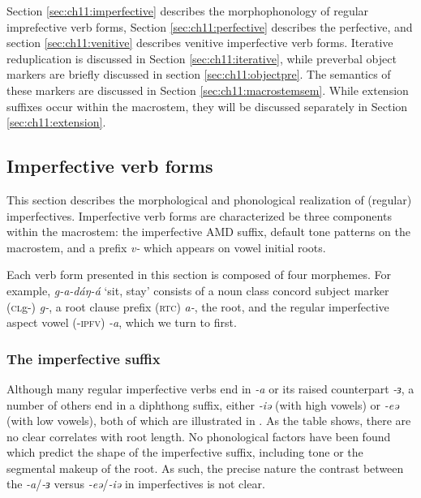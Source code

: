 Section \ref{sec:ch11:imperfective} describes the morphophonology of regular imprefective verb forms, Section \ref{sec:ch11:perfective} describes the perfective, and section \ref{sec:ch11:venitive} describes venitive imperfective verb forms. Iterative reduplication is discussed in Section \ref{sec:ch11:iterative}, while preverbal object markers are briefly discussed in section \ref{sec:ch11:objectpre}. The semantics of these markers are discussed in Section \ref{sec:ch11:macrostemsem}. While extension suffixes occur within the macrostem, they will be discussed separately in Section \ref{sec:ch11:extension}. 

					

\subsection{Imperfective verb forms}\label{sec:ch11:ipfvform}

This section describes the morphological and phonological realization of (regular) imperfectives. Imperfective verb forms are characterized be three components within the macrostem: the imperfective AMD suffix, default tone patterns on the macrostem, and a prefix \textit{v-} which appears on vowel initial roots.

Each verb form presented in this section is composed of four morphemes. For example, \textit{g-a-dáŋ-á} ‘sit, stay’ consists of a noun class concord subject marker (\textsc{cl}g-) \textit{g-}, a root clause prefix (\textsc{rtc}) \textit{a-}, the root, and the regular imperfective aspect vowel (-\textsc{ipfv}) \textit{-a}, which we turn to first.

\subsubsection{The imperfective suffix}

Although many regular imperfective verbs end in \textit{-a} or its raised counterpart \textit{-ɜ}, a number of others end in a diphthong suffix, either \textit{-iə} (with high vowels) or \textit{-eə} (with low vowels), both of which are illustrated in . As the table shows, there are no clear correlates with root length. No phonological factors have been found which predict the shape of the imperfective suffix, including tone or the segmental makeup of the root. As such, the precise nature the contrast between the \textit{-a}/\textit{-ɜ} versus \textit{-eə}/\textit{-iə} in imperfectives is not clear.

